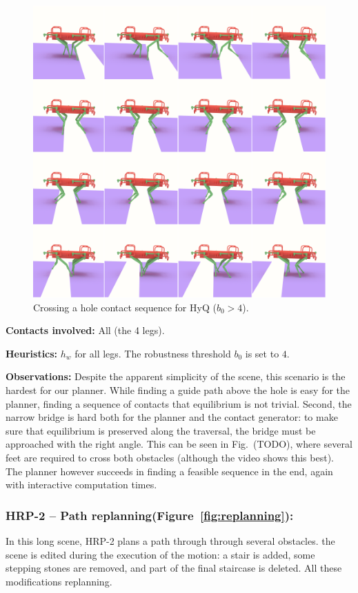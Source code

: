 \begin{figure}
  \centering
  \includegraphics[width=0.5\linewidth]{figures/hyq_obs}
  \caption{
           Crossing a hole contact sequence for HyQ ($b_0 > 4$). }
		   \label{fig:hyq_obs}
\end{figure}



\noindent\textbf{Contacts involved:} All (the 4 legs).

\noindent\textbf{Heuristics:} $h_w$  for all legs. The robustness threshold $b_0$ is set to $4$.

\noindent\textbf{Observations:} Despite the apparent simplicity of the scene, this scenario is the hardest  for our planner.
While finding a guide path above the hole is easy for the planner, finding a  sequence of contacts that  equilibrium is not trivial.
Second, the narrow bridge is hard both for the planner and the contact generator: to make sure that equilibrium is preserved along the traversal,
the bridge must be approached with the right angle.
This can be seen in Fig.~(TODO), where several feet  are required to cross both obstacles (although the video shows this best).
The planner however succeeds in finding a feasible sequence in the end, again with interactive computation times.

\subsubsection{HRP-2 -- Path replanning(Figure~\ref{fig:replanning}):}
In this long scene, HRP-2 plans a path through through several obstacles. the scene is edited during the execution of the motion: a stair is added,
some stepping stones are removed, and part of the final staircase is deleted. All these modifications  replanning.



